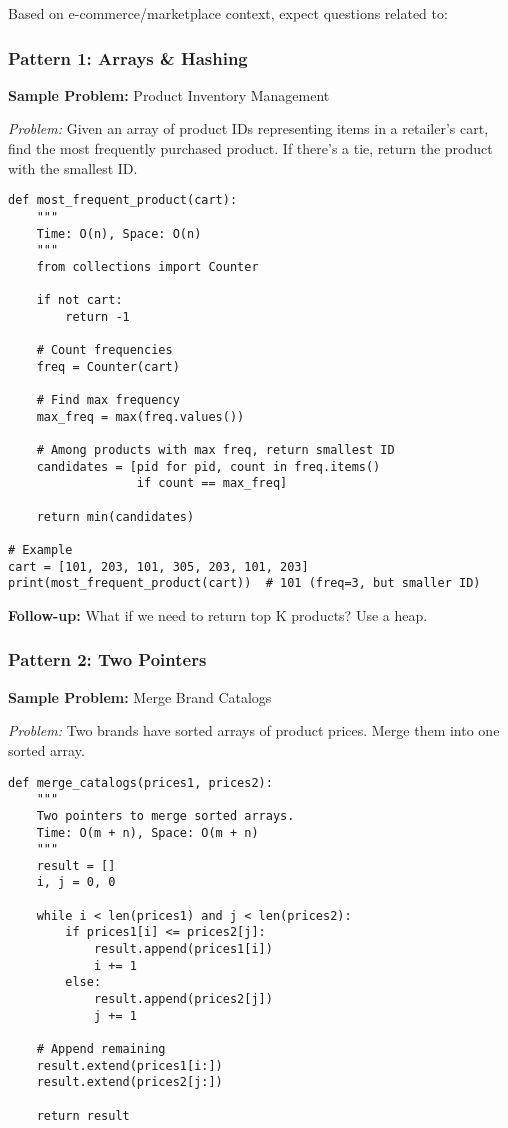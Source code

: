 \documentclass[11pt,letterpaper]{article}
\begin{document}
Based on e-commerce/marketplace context, expect questions related to:

\subsubsection{Pattern 1: Arrays \& Hashing}

\textbf{Sample Problem:} Product Inventory Management

\textit{Problem:} Given an array of product IDs representing items in a retailer's cart, find the most frequently purchased product. If there's a tie, return the product with the smallest ID.

\begin{lstlisting}
def most_frequent_product(cart):
    """
    Time: O(n), Space: O(n)
    """
    from collections import Counter

    if not cart:
        return -1

    # Count frequencies
    freq = Counter(cart)

    # Find max frequency
    max_freq = max(freq.values())

    # Among products with max freq, return smallest ID
    candidates = [pid for pid, count in freq.items()
                  if count == max_freq]

    return min(candidates)

# Example
cart = [101, 203, 101, 305, 203, 101, 203]
print(most_frequent_product(cart))  # 101 (freq=3, but smaller ID)
\end{lstlisting}

\textbf{Follow-up:} What if we need to return top K products? Use a heap.

\subsubsection{Pattern 2: Two Pointers}

\textbf{Sample Problem:} Merge Brand Catalogs

\textit{Problem:} Two brands have sorted arrays of product prices. Merge them into one sorted array.

\begin{lstlisting}
def merge_catalogs(prices1, prices2):
    """
    Two pointers to merge sorted arrays.
    Time: O(m + n), Space: O(m + n)
    """
    result = []
    i, j = 0, 0

    while i < len(prices1) and j < len(prices2):
        if prices1[i] <= prices2[j]:
            result.append(prices1[i])
            i += 1
        else:
            result.append(prices2[j])
            j += 1

    # Append remaining
    result.extend(prices1[i:])
    result.extend(prices2[j:])

    return result
\end{lstlisting}
\end{document}
